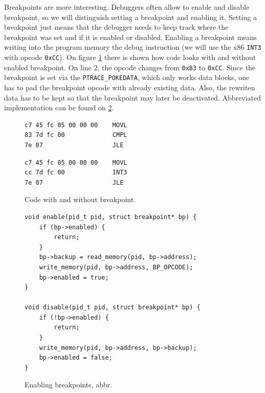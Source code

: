 Breakpoints are more interesting. Debuggers often allow to enable and disable
breakpoint, so we will distinguish setting a breakpoint and enabling it.
Setting a breakpoint just means that the debugger needs to keep track where the
breakpoint was set and if it is enabled or disabled. Enabling a breakpoint
means writing into the program memory the debug instruction (we will use the
x86 \texttt{INT3} with opcode \texttt{0xCC}). On figure
\ref{fig:with-and-without-bp} there is shown how code looks with and without
enabled breakpoint. On line $2$, the opcode changes from \texttt{0x83} to
\texttt{0xCC}. Since the breakpoint is set via the \texttt{PTRACE\_POKEDATA},
which only works data blocks, one has to pad the breakpoint opcode with already
existing data. Also, the rewriten data has to be kept so that the breakpoint
may later be deactivated. Abbreviated implementation can be found on
\ref{fig:breakpoint-enable}.

\begin{figure}\label{fig:with-and-without-bp}
    \begin{minipage}{0.45\textwidth}
        \begin{lstlisting}
c7 45 fc 05 00 00 00 	MOVL
83 7d fc 00          	CMPL
7e 07                	JLE
        \end{lstlisting}
    \end{minipage}
    \begin{minipage}{0.45\textwidth}
        \begin{lstlisting}
c7 45 fc 05 00 00 00 	MOVL
cc 7d fc 00          	INT3
7e 07                	JLE
        \end{lstlisting}
    \end{minipage}
    \caption{Code with and without breakpoint.}
\end{figure}

\begin{figure}\label{fig:breakpoint-enable}
    \begin{verbatim}
void enable(pid_t pid, struct breakpoint* bp) {
    if (bp->enabled) {
        return;
    }
    bp->backup = read_memory(pid, bp->address);
    write_memory(pid, bp->address, BP_OPCODE);
    bp->enabled = true;
}

void disable(pid_t pid, struct breakpoint* bp) {
    if (!bp->enabled) {
        return;
    }
    write_memory(pid, bp->address, bp->backup);
    bp->enabled = false;
}
    \end{verbatim}
    \caption{Enabling breakpoints, abbr.}
\end{figure}

